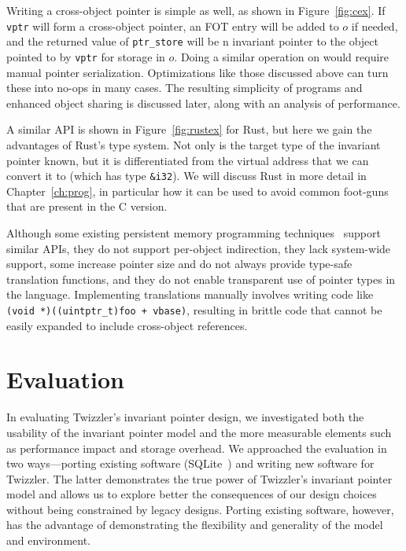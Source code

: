 Writing a cross-object pointer is simple as well, as shown in Figure~\ref{fig:cex}.
If \texttt{vptr} will form a cross-object pointer, an FOT entry will be added to $o$ if
needed, and the returned value of \texttt{ptr\_store} will be n invariant
pointer to the object pointed to by \texttt{vptr} for storage in $o$. Doing a
similar operation on \unix would require manual pointer serialization.
Optimizations like those discussed above can
turn these into no-ops in many cases. The resulting simplicity of programs and
enhanced object sharing is
discussed later, along with an analysis of performance.

A similar API is shown in Figure~\ref{fig:rustex} for Rust, but here we gain the advantages of Rust's type system. Not
only is the target type of the invariant pointer known, but it is differentiated from the virtual address that we can
convert it to (which has type \texttt{\&i32}). We will discuss Rust in more detail in Chapter~\ref{ch:prog}, in
particular how it can be used to avoid common foot-guns that are present in the C version.

Although some existing persistent memory programming
techniques~\cite{libpmem,Chen:micro17,wang:micro17} support similar
APIs, they do not support per-object indirection, they lack system-wide support,
some increase pointer size and do not always provide
type-safe translation functions, and they do not enable transparent use of pointer
types in the language. Implementing translations manually involves writing code
like
\texttt{(void *)((uintptr\_t)foo + vbase)}, resulting in brittle code that
cannot be easily expanded to include cross-object references.


\section{Evaluation}

In evaluating Twizzler's invariant pointer design, we investigated both the
usability of the invariant pointer model and the more measurable elements such as performance impact
and storage overhead. We approached the evaluation in two ways---porting existing software
(SQLite~\cite{sqlite}) and writing new software for Twizzler. The latter demonstrates the true power of
Twizzler's invariant pointer model and allows us to explore better the consequences of our design
choices without being constrained by legacy designs. Porting existing software, however, has the
advantage of demonstrating the flexibility and generality of the model and environment.

